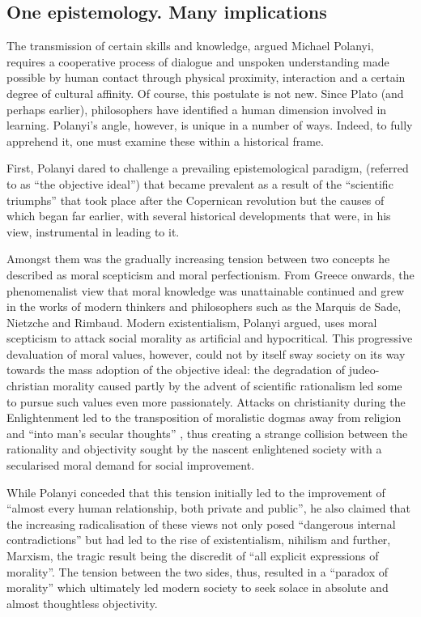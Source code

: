 \subsection{One epistemology. Many implications}

The transmission of certain skills and knowledge, argued Michael Polanyi, requires a cooperative process of dialogue and unspoken understanding made possible by human contact through physical proximity, interaction and a certain degree of cultural affinity. Of course, this postulate is not new. Since Plato (and perhaps earlier), philosophers have identified a human dimension involved in learning. Polanyi's angle, however, is unique in a number of ways. Indeed, to fully apprehend it, one must examine these within a historical frame.

First, Polanyi dared to challenge a prevailing epistemological paradigm, (referred to as ``the objective ideal'') that became prevalent as a result of the ``scientific triumphs'' \citep[p.17]{gelwick77} that took place after the Copernican revolution but the causes of which began far earlier, with several historical developments that were, in his view, instrumental in leading to it.

Amongst them was the gradually increasing tension between two concepts he described as moral scepticism and moral perfectionism. From Greece onwards, the phenomenalist view that moral knowledge was unat\-tainable continued and grew in the works of modern thinkers and philosophers such as the Marquis de Sade, Nietzche and Rimbaud. Modern existentialism, Polanyi argued, uses moral scepticism to attack social morality as artificial and hypocritical. This progressive devaluation of moral values, however, could not by itself sway society on its way towards the mass adoption of the objective ideal: the degradation of judeo-christian morality caused partly by the advent of scientific rationalism led some to pursue such values even more passionately. Attacks on christianity during the Enlightenment led to the transposition of moralistic dogmas away from religion and ``into man's secular thoughts'' \citep[p.57]{polanyi66}, thus creating a strange collision between the rationality and objectivity sought by the nascent enlightened society with a secularised moral demand for social improvement. 

While Polanyi conceded that this tension initially led to the improvement of ``almost every human relationship, both private and public'', he also claimed that the increasing radicalisation of these views not only posed ``dangerous internal contradictions'' \citep[p.58]{polanyi66} but had led to the rise of existentialism, nihilism and further, Marxism, the tragic result being the discredit of ``all explicit expressions of morality''. The tension between the two sides, thus, resulted in a ``paradox of morality'' which ultimately led modern society to seek solace in absolute and almost thoughtless objectivity.

